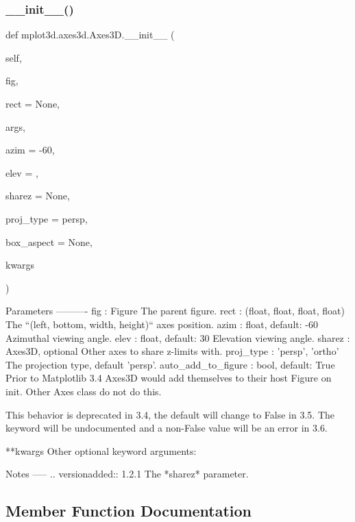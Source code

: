 \subsubsection{\texorpdfstring{\+\_\+\+\_\+init\+\_\+\+\_\+()}{\_\_init\_\_()}}
{\footnotesize\ttfamily def mplot3d.\+axes3d.\+Axes3\+D.\+\_\+\+\_\+init\+\_\+\+\_\+ (\begin{DoxyParamCaption}\item[{}]{self,  }\item[{}]{fig,  }\item[{}]{rect = {\ttfamily None},  }\item[{}]{args,  }\item[{}]{azim = {\ttfamily -\/60},  }\item[{}]{elev = {},  }\item[{}]{sharez = {\ttfamily None},  }\item[{}]{proj\+\_\+type = {\ttfamily \textquotesingle{}persp\textquotesingle{}},  }\item[{}]{box\+\_\+aspect = {\ttfamily None},  }\item[{}]{kwargs }\end{DoxyParamCaption})}

\begin{DoxyVerb}Parameters
----------
fig : Figure
    The parent figure.
rect : (float, float, float, float)
    The ``(left, bottom, width, height)`` axes position.
azim : float, default: -60
    Azimuthal viewing angle.
elev : float, default: 30
    Elevation viewing angle.
sharez : Axes3D, optional
    Other axes to share z-limits with.
proj_type : {'persp', 'ortho'}
    The projection type, default 'persp'.
auto_add_to_figure : bool, default: True
    Prior to Matplotlib 3.4 Axes3D would add themselves
    to their host Figure on init.  Other Axes class do not
    do this.

    This behavior is deprecated in 3.4, the default will
    change to False in 3.5.  The keyword will be undocumented
    and a non-False value will be an error in 3.6.

**kwargs
    Other optional keyword arguments:


Notes
-----
.. versionadded:: 1.2.1
    The *sharez* parameter.
\end{DoxyVerb}
 

\subsection{Member Function Documentation}
\mbox{\label{classmplot3d_1_1axes3d_1_1Axes3D_a67424524d3e76a9ed82fb24c550ac4a4}} 
